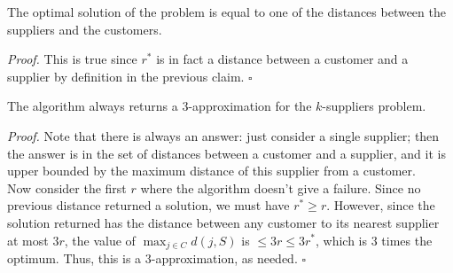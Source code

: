 \documentclass[a4paper]{article}
\newenvironment{proof}{\begin{breakbox}\textit{Proof.}}{\hfill$\square$\end{breakbox}}
\newcommand{\nl}{\vspace{0.2cm}\\}
\begin{document}
\begin{claim}
    The optimal solution of the problem is equal to one of the distances between the suppliers and the customers.
\end{claim}
\begin{proof}
    This is true since $r^*$ is in fact a distance between a customer and a supplier by definition in the previous claim.
\end{proof}
\begin{claim}
    The algorithm always returns a $3$-approximation for the $k$-suppliers problem.
\end{claim}
\begin{proof}
    Note that there is always an answer: just consider a single supplier; then the answer is in the set of distances between a customer and a supplier, and it is upper bounded by the maximum
    distance of this supplier from a customer.\nl
    Now consider the first $r$ where the algorithm doesn't give a failure. Since no previous distance returned a solution, we must have $r^* \ge r$. However, since the solution returned has the
    distance between any customer to its nearest supplier at most $3r$, the value of $\max_{j \in C} d(j, S)$ is $\le 3r \le 3r^*$, which is $3$ times the optimum. Thus, this is a $3$-approximation,
    as needed.
\end{proof}
\end{document}
